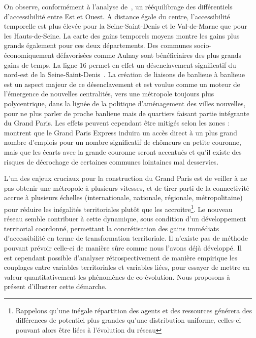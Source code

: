 On observe, conformément à l'analyse de~\cite{beaucire2013grand}, un rééquilibrage des différentiels d'accessibilité entre Est et Ouest. A distance égale du centre, l'accessibilité temporelle est plus élevée pour la Seine-Saint-Denis et le Val-de-Marne que pour les Hauts-de-Seine. La carte des gains temporels moyens montre les gains plus grands également pour ces deux départements. Des communes socio-économiquement défavorisées comme Aulnay sont bénéficiaires des plus grands gains de temps. La ligne 16 permet en effet un désenclavement significatif du nord-est de la Seine-Saint-Denis~\cite{desjardins2016grand}. La création de liaisons de banlieue à banlieue est un aspect majeur de ce désenclavement et est voulue comme un moteur de l'émergence de nouvelles centralités, vers une métropole toujours plus polycentrique, dans la lignée de la politique d'aménagement des villes nouvelles, pour ne plus parler de proche banlieue mais de quartiers faisant partie intégrante du Grand Paris. Les effets peuvent cependant être mitigés selon les zones : \cite{l2013grand} montrent que le Grand Paris Express induira un accès direct à un plus grand nombre d'emplois pour un nombre significatif de chômeurs en petite couronne, mais que les écarts avec la grande couronne seront accentués et qu'il existe des risques de décrochage de certaines communes lointaines mal desservies. 


L'un des enjeux cruciaux pour la construction du Grand Paris est de veiller à ne pas obtenir une métropole à plusieurs vitesses, et de tirer parti de la connectivité accrue à plusieurs échelles (internationale, nationale, régionale, métropolitaine) pour réduire les inégalités territoriales plutôt que les accroitre\footnote{Rappelons qu'une inégale répartition des agents et des ressources générera des différences de potentiel plus grandes qu'une distribution uniforme, celles-ci pouvant alors être liées à l'évolution du réseau}. Le nouveau réseau semble contribuer à cette dynamique, sous condition d'un développement territorial coordonné, permettant la concrétisation des gains immédiats d'accessibilité en terme de transformation territoriale. Il n'existe pas de méthode pouvant prévoir celle-ci de manière sûre comme nous l'avons déjà développé. Il est cependant possible d'analyser rétrospectivement de manière empirique les couplages entre variables territoriales et variables liées, pour essayer de mettre en valeur quantitativement les phénomènes de co-évolution. Nous proposons à présent d'illustrer cette démarche.






